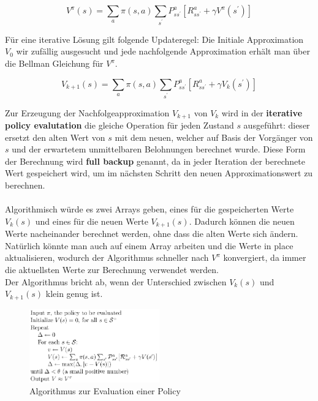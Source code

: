 \documentclass[10pt]{scrartcl}
\begin{document}
\begin{equation}
V^\pi (s) = \sum_{a} \pi(s,a) \sum_{s^{'}} P^a_{ss^{'}} [R^a_{ss^{'}} + \gamma V^\pi (s^{'})]
\end{equation}

Für eine iterative Lösung gilt folgende Updateregel: Die Initiale Approximation $V_{0}$ wir zufällig ausgesucht und jede nachfolgende Approximation erhält man über die Bellman Gleichung für $V^{\pi}$.

\begin{equation}
V_{k+1} (s) = \sum_{a} \pi(s,a) \sum_{s^{'}} P^a_{ss^{'}} [R^a_{ss^{'}} + \gamma V_{k} (s^{'})]
\end{equation}

Zur Erzeugung der Nachfolgeapproximation $V_{k+1}$ von $V_{k}$ wird in der \textbf{iterative policy evalutation} die gleiche Operation für jeden Zustand $s$ ausgeführt: dieser ersetzt den alten Wert von $s$ mit dem neuen, welcher auf Basis der Vorgänger von $s$ und der erwartetem unmittelbaren Belohnungen berechnet wurde. Diese Form der Berechnung wird \textbf{full backup} genannt, da in jeder Iteration der berechnete Wert gespeichert wird, um im nächsten Schritt den neuen Approximationswert zu berechnen.\\
\\
Algorithmisch würde es zwei Arrays geben, eines für die gespeicherten Werte $V_{k}(s)$ und eines für die neuen Werte $V_{k+1}(s)$. Dadurch können die neuen Werte nacheinander berechnet werden, ohne dass die alten Werte sich ändern. Natürlich könnte man auch auf einem Array arbeiten und die Werte \glqq in place\grqq\xspace aktualisieren, wodurch der Algorithmus schneller nach  $V^\pi$ konvergiert, da immer die aktuellsten Werte zur Berechnung verwendet werden.\\
Der Algorithmus bricht ab, wenn der Unterschied zwischen $V_{k}(s)$ und $V_{k+1}(s)$ klein genug ist.

\begin{figure}[htbp]
	\centering	\includegraphics[width=0.5\textwidth]{Bilder/Evaluation.png}
	\caption{Algorithmus zur Evaluation einer Policy}
	\label{fig:Evaluation}
\end{figure}
\end{document}

